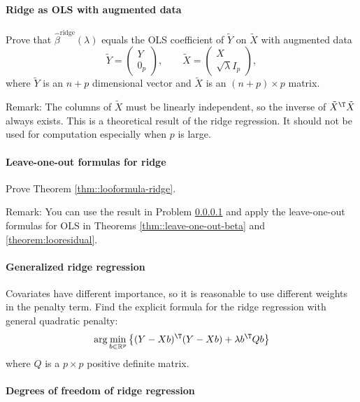 \paragraph{Ridge as OLS with augmented data}\label{hw13::ridge-data-aug}

Prove that $\hat{\beta}^{\text{ridge}}(\lambda)$ equals the OLS coefficient of $\tilde{Y}$ on $\tilde{X}$ with
augmented data
\[
\tilde{Y}=\left(\begin{array}{c}
Y\\
0_{p}
\end{array}\right),\qquad
\tilde{X}=\left(\begin{array}{c}
X\\
\sqrt{\lambda}I_{p}
\end{array}\right) ,
\]
where $ \tilde{Y}$ is an $n+p$ dimensional vector and $ \tilde{X}$ is an $(n+p)\times p$ matrix. 


Remark: The columns of $\tilde{X}$ must be linearly independent, so the inverse of $\tilde{X}^{\T} \tilde{X}$ always exists. 
This is a theoretical result of the ridge regression. It should not be used for computation especially when $p$ is large. 

\paragraph{Leave-one-out formulas for ridge}\label{hw13::loo-ridge}


Prove Theorem \ref{thm::looformula-ridge}. 


Remark: You can use the result in Problem \ref{hw13::ridge-data-aug} and apply the leave-one-out formulas for OLS in Theorems \ref{thm::leave-one-out-beta} and \ref{theorem:looresidual}. 




\paragraph{Generalized ridge regression}\label{hw13::general-ridge}

Covariates have different importance, so it is reasonable to use different weights in the
penalty term. Find the explicit formula for the ridge regression
with general quadratic penalty:
\[
\arg\min_{b\in\mathbb{R}^{p}}\left\{ (Y-Xb)^{\T}  (Y-Xb) +\lambda b^{\T}Qb\right\} 
\]
where $Q$ is a $p\times p$ positive definite matrix. 





\paragraph{Degrees of freedom of ridge regression}


